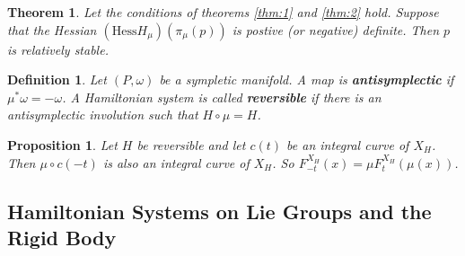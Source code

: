 \documentclass{article}
\newtheorem{thm}{Theorem}
\newtheorem{defn}{Definition}
\newtheorem{prop}{Proposition}
\begin{document}
\begin{thm}
Let the conditions of theorems \ref{thm:1} and \ref{thm:2} hold. Suppose that the Hessian $(\mathrm{Hess}H_{\mu})(\pi_{\mu}(p))$ is postive (or negative) definite. Then $p$ is relatively stable.
\end{thm}

\begin{defn}
Let $(P,\omega)$ be a sympletic manifold. A map is \textbf{antisymplectic} if $\mu^* \omega = - \omega$. A Hamiltonian system is called \textbf{reversible} if there is an antisymplectic involution such that $H \circ \mu = H$.
\end{defn}

\begin{prop}
Let $H$ be reversible and let $c(t)$ be an integral curve of $X_H$. Then $\mu \circ c(-t)$ is also an integral curve of $X_H$. So $F^{X_H}_{-t}(x) = \mu F^{X_H}_t(\mu(x)) $.
\end{prop}

\subsection{Hamiltonian Systems on Lie Groups and the Rigid Body}
\end{document}
